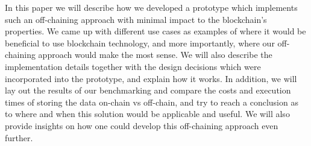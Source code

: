 In this paper we will describe how we developed a prototype which implements such an off-chaining approach with minimal impact to the blockchain’s properties. We came up with different use cases as examples of where it would be beneficial to use blockchain technology, and more importantly, where our off-chaining approach would make the most sense. We will also describe the implementation details together with the design decisions which were incorporated into the prototype, and explain how it works. In addition, we will lay out the results of our benchmarking and compare the costs and execution times of storing the data on-chain vs off-chain, and try to reach a conclusion as to where and when this solution would be applicable and useful. We will also provide insights on how one could develop this off-chaining approach even further.

\newpage
